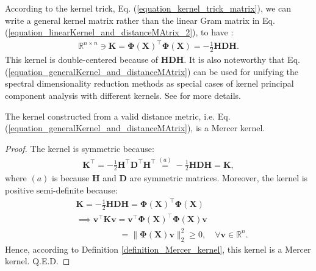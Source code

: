 \documentclass[lang=cn,10pt]{gorgeousnbook}
\numberwithin{equation}{section}%
\numberwithin{figure}{section}%
\begin{document}
According to the kernel trick, Eq. (\ref{equation_kernel_trick_matrix}), we can write a general kernel matrix rather than the linear Gram matrix in Eq. (\ref{equation_linearKernel_and_distanceMAtrix_2}), to have \cite{cox2008multidimensional}:
\begin{align}\label{equation_generalKernel_and_distanceMAtrix}
\mathbb{R}^{n \times n} \ni \boldsymbol{K} = \boldsymbol{\Phi}(\boldsymbol{X})^\top \boldsymbol{\Phi}(\boldsymbol{X}) = -\frac{1}{2} \boldsymbol{HDH}.
\end{align}
This kernel is double-centered because of $\boldsymbol{HDH}$.  
It is also noteworthy that Eq. (\ref{equation_generalKernel_and_distanceMAtrix}) can be used for unifying the spectral dimensionality reduction methods as special cases of kernel principal component analysis with different kernels. See \cite{ham2004kernel,bengio2004learning} for more details. 

\begin{lemma}
The kernel constructed from a valid distance metric, i.e. Eq. (\ref{equation_generalKernel_and_distanceMAtrix}), is a Mercer kernel. 
\end{lemma}
\begin{proof}
The kernel is symmetric because:
\begin{align*}
\boldsymbol{K}^\top = -\frac{1}{2} \boldsymbol{H}^\top \boldsymbol{D}^\top \boldsymbol{H}^\top \overset{(a)}{=} -\frac{1}{2} \boldsymbol{HDH} = \boldsymbol{K},
\end{align*}
where $(a)$ is because $\boldsymbol{H}$ and $\boldsymbol{D}$ are symmetric matrices. 
Moreover, the kernel is positive semi-definite because:
\begin{align*}
&\boldsymbol{K} = -\frac{1}{2} \boldsymbol{HDH} = \boldsymbol{\Phi}(\boldsymbol{X})^\top \boldsymbol{\Phi}(\boldsymbol{X}) \\
&\implies \boldsymbol{v}^\top \boldsymbol{K} \boldsymbol{v} = \boldsymbol{v}^\top \boldsymbol{\Phi}(\boldsymbol{X})^\top \boldsymbol{\Phi}(\boldsymbol{X}) \boldsymbol{v} \\
&~~~~~~~~~~~~~~~~~~~~~~~ = \|\boldsymbol{\Phi}(\boldsymbol{X}) \boldsymbol{v}\|_2^2 \geq 0, \quad \forall \boldsymbol{v} \in \mathbb{R}^n. 
\end{align*}
Hence, according to Definition \ref{definition_Mercer_kernel}, this kernel is a Mercer kernel. Q.E.D.
\end{proof}
\end{document}
